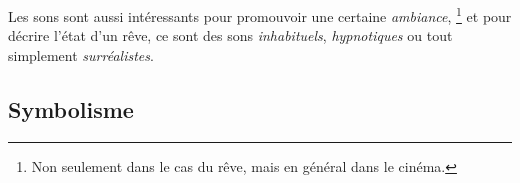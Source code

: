 \documentclass[../main.tex]{subfile}
\begin{document}
Les sons sont aussi intéressants pour promouvoir une certaine \emph{ambiance},
\footnote{Non seulement dans le cas du rêve, mais en général dans le cinéma.} et
pour décrire l'état d'un rêve, ce sont des sons \emph{inhabituels},
\emph{hypnotiques} ou tout simplement \emph{surréalistes}.

\subsection{Symbolisme}
\end{document}
